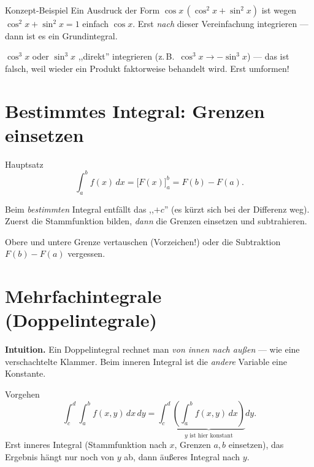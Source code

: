 \documentclass[a4paper,11pt]{article}
\begin{document}
\begin{bspbox}{Konzept-Beispiel}
Ein Ausdruck der Form $\cos x\,(\cos^2x+\sin^2x)$ ist wegen $\cos^2x+\sin^2x=1$ einfach
$\cos x$. Erst \emph{nach} dieser Vereinfachung integrieren — dann ist es ein Grundintegral.
\end{bspbox}

\begin{fehlerbox}
$\cos^3x$ oder $\sin^3x$ ,,direkt'' integrieren (z.\,B.\ $\cos^3x\to-\sin^3x$) — das ist falsch,
weil wieder ein Produkt faktorweise behandelt wird. Erst umformen!
\end{fehlerbox}

\section{Bestimmtes Integral: Grenzen einsetzen}

\begin{satzbox}{Hauptsatz}
\[
  \int_a^b f(x)\,dx=\bigl[F(x)\bigr]_a^b=F(b)-F(a).
\]
\end{satzbox}
Beim \emph{bestimmten} Integral entfällt das ,,$+c$'' (es kürzt sich bei der Differenz weg).
Zuerst die Stammfunktion bilden, \emph{dann} die Grenzen einsetzen und subtrahieren.

\begin{fehlerbox}
Obere und untere Grenze vertauschen (Vorzeichen!) oder die Subtraktion $F(b)-F(a)$ vergessen.
\end{fehlerbox}

\section{Mehrfachintegrale (Doppelintegrale)}

\textbf{Intuition.} Ein Doppelintegral rechnet man \emph{von innen nach außen} — wie eine
verschachtelte Klammer. Beim inneren Integral ist die \emph{andere} Variable eine Konstante.

\begin{satzbox}{Vorgehen}
\[
  \int_{c}^{d}\!\!\int_{a}^{b} f(x,y)\,dx\,dy
  =\int_{c}^{d}\underbrace{\left(\int_a^b f(x,y)\,dx\right)}_{\text{$y$ ist hier konstant}}dy.
\]
Erst inneres Integral (Stammfunktion nach $x$, Grenzen $a,b$ einsetzen), das Ergebnis hängt nur
noch von $y$ ab, dann äußeres Integral nach $y$.
\end{satzbox}
\end{document}
